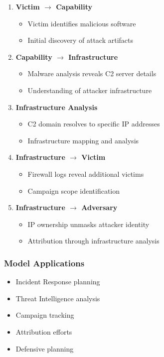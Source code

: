 \begin{enumerate}
    \item \textbf{Victim $\rightarrow$ Capability}
    \begin{itemize}
        \item Victim identifies malicious software
        \item Initial discovery of attack artifacts
    \end{itemize}
    
    \item \textbf{Capability $\rightarrow$ Infrastructure}
    \begin{itemize}
        \item Malware analysis reveals C2 server details
        \item Understanding of attacker infrastructure
    \end{itemize}
    
    \item \textbf{Infrastructure Analysis}
    \begin{itemize}
        \item C2 domain resolves to specific IP addresses
        \item Infrastructure mapping and analysis
    \end{itemize}
    
    \item \textbf{Infrastructure $\rightarrow$ Victim}
    \begin{itemize}
        \item Firewall logs reveal additional victims
        \item Campaign scope identification
    \end{itemize}
    
    \item \textbf{Infrastructure $\rightarrow$ Adversary}
    \begin{itemize}
        \item IP ownership unmasks attacker identity
        \item Attribution through infrastructure analysis
    \end{itemize}
\end{enumerate}

\subsubsection{Model Applications}
\begin{itemize}
    \item Incident Response planning
    \item Threat Intelligence analysis
    \item Campaign tracking
    \item Attribution efforts
    \item Defensive planning
\end{itemize}

